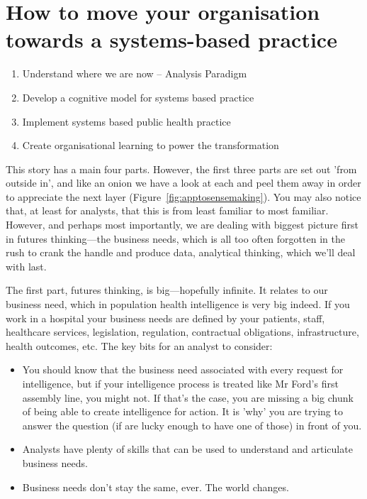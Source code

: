 \section{How to move your organisation towards a systems-based practice}

\begin{enumerate}
	\item Understand where we are now -- Analysis Paradigm
	\item Develop a cognitive model for systems based practice
	\item Implement systems based public health practice
	\item Create organisational learning to power the transformation
\end{enumerate}

This story has a main four parts. However, the first three parts are set out 'from outside in', and like an onion we have a look at each and peel them away in order to appreciate the next layer (Figure~\ref{fig:apptosensemaking}). You may also notice that, at least for analysts, that this is from least familiar to most familiar. However, and perhaps most importantly, we are dealing with biggest picture first in futures thinking---the business needs, which is all too often forgotten in the rush to crank the handle and produce data, analytical thinking, which we'll deal with last.

The first part, futures thinking, is big---hopefully infinite. It relates to our business need, which in population health intelligence is very big indeed. If you work in a hospital your business needs are defined by your patients, staff, healthcare services, legislation, regulation, contractual obligations, infrastructure, health outcomes, etc. The key bits for an analyst to consider:
\begin{itemize}
	\item You should know that the business need associated with every request for intelligence, but if your intelligence process is treated like Mr Ford's first assembly line, you might not. If that's the case, you are missing a big chunk of being able to create intelligence for action. It is 'why' you are trying to answer the question (if are lucky enough to have one of those) in front of you.
	\item Analysts have plenty of skills that can be used to understand and articulate business needs.
	\item Business needs don't stay the same, ever. The world changes.
\end{itemize}

